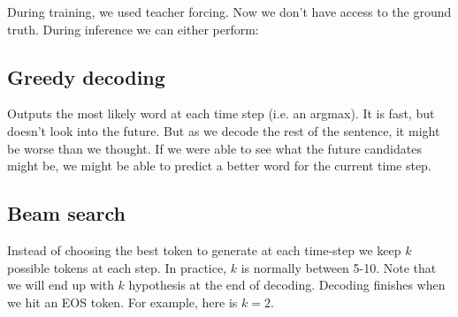 \documentclass[11pt]{article}
\begin{document}
During training, we used teacher forcing. Now we don't have access to the ground truth. During inference we can either perform:

\subsection{Greedy decoding}

Outputs the most likely word at each time step (i.e. an argmax). It is fast, but doesn't look into the future. But as we decode the rest of the sentence, it might be worse than we thought. If we were able to see what the future candidates might be, we might be able to predict a better word for the current time step.

\begin{figure}[H]
    \centering
\end{figure}

\subsection{Beam search}

Instead of choosing the best token to generate at each time-step we keep $k$ possible tokens at each step. In practice, $k$ is normally between 5-10. Note that we will end up with $k$ hypothesis at the end of decoding. Decoding finishes when we hit an EOS token. For example, here is $k=2$.
\end{document}
